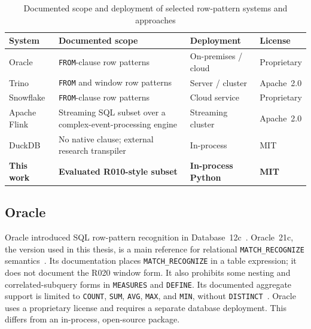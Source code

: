 \begin{table}[htbp]
  \centering
  \caption[Scope and deployment of selected row-pattern systems]{Documented scope and deployment of selected row-pattern
    systems and approaches}
  \label{tab:engine-comparison}
  \small
  \setlength{\tabcolsep}{4pt}
  \begin{tabularx}{\textwidth}{l>{\raggedright\arraybackslash}Xll}
    \toprule
    \textbf{System} & \textbf{Documented scope} &
      \textbf{Deployment} & \textbf{License} \\
    \midrule
    Oracle & \texttt{FROM}-clause row patterns &
      On-premises / cloud & Proprietary \\
    Trino & \texttt{FROM} and window row patterns &
      Server / cluster & Apache~2.0 \\
    Snowflake & \texttt{FROM}-clause row patterns &
      Cloud service & Proprietary \\
    Apache Flink & Streaming SQL subset over a complex-event-processing
      engine &
      Streaming cluster & Apache~2.0 \\
    DuckDB & No native clause; external research transpiler &
      In-process & MIT \\
    \midrule
    \textbf{This work} & \textbf{Evaluated R010-style subset} &
      \textbf{In-process Python} & \textbf{MIT} \\
    \bottomrule
  \end{tabularx}
\end{table}

\subsection{Oracle}
\label{subsec:related-oracle}

Oracle introduced SQL row-pattern recognition in
Database~12c~\cite{OracleMR}.  Oracle~21c, the version used in this
thesis, is a main reference for relational
\texttt{MATCH\_RECOGNIZE} semantics~\cite{oracle2021dwhsg,book}.
Its documentation places \texttt{MATCH\_RECOGNIZE} in a table
expression; it does not document the R020 window form.  It also
prohibits some nesting and correlated-subquery forms in
\texttt{MEASURES} and \texttt{DEFINE}.
Its documented aggregate support is limited to \texttt{COUNT},
\texttt{SUM}, \texttt{AVG}, \texttt{MAX}, and \texttt{MIN}, without
\texttt{DISTINCT}~\cite{oracle2021dwhsg}.
Oracle uses a proprietary license and requires a separate database
deployment.  This differs from an in-process, open-source package.

